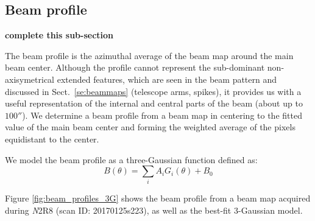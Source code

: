 



\subsection{Beam profile}
\label{se:fullbeam_prof}

{\bf complete this sub-section}

The beam profile is the azimuthal average of the beam map around the
main beam center. Although the profile cannot represent the sub-dominant non-axisymetrical
extended features, which are seen in the beam pattern and discussed in
Sect.~\ref{se:beammaps} (telescope arms, spikes), it provides us with a useful
representation of the internal and central parts of the beam (about up to
$100''$). We determine a beam profile from a beam map in centering to
the fitted value of the main beam center and forming the
weighted average of the pixels equidistant to the center.

We model the beam profile as a three-Gaussian function defined as:
\begin{equation}
  B(\theta) = \sum_i A_i G_i(\theta) + B_0
\end{equation}


Figure \ref{fig:beam_profiles_3G} shows the beam profile from a beam
map acquired during {\emph N2R8} (scan ID: 20170125s223), as well as
the best-fit 3-Gaussian model. 

